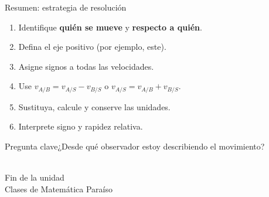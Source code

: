 \documentclass[aspectratio=169,10pt]{beamer}
\begin{document}
\begin{frame}{Resumen: estrategia de resolución}\begin{enumerate}\item Identifique \textbf{quién se mueve} y \textbf{respecto a quién}.\item Defina el eje positivo (por ejemplo, este).\item Asigne signos a todas las velocidades.\item Use $v_{A/B}=v_{A/S}-v_{B/S}$ o $v_{A/S}=v_{A/B}+v_{B/S}$.\item Sustituya, calcule y conserve las unidades.\item Interprete signo y rapidez relativa.\end{enumerate}\begin{exampleblock}{Pregunta clave}¿Desde qué observador estoy describiendo el movimiento?\end{exampleblock}\end{frame}
\begin{frame}\\[.5cm]{\Large Fin de la unidad}\\[.5cm]Clases de Matemática Paraíso\end{frame}
\end{document}
